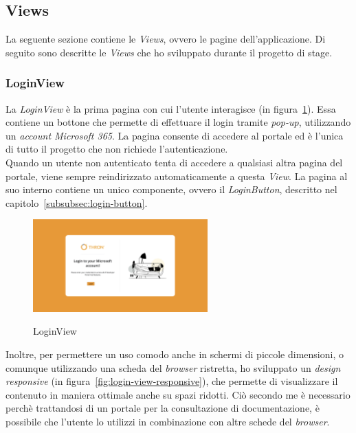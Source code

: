 \subsection{Views}\label{subsec:views}
La seguente sezione contiene le \textit{Views}, ovvero le pagine dell'applicazione.
Di seguito sono descritte le \textit{Views} che ho sviluppato durante il progetto di stage.

\subsubsection{LoginView}\label{subsubsec:login-view}
La \textit{LoginView} è la prima pagina con cui l'utente interagisce (in figura~\ref{fig:login-view}). Essa contiene un bottone che permette di effettuare il login tramite \textit{pop-up}, utilizzando un \textit{account Microsoft 365}.
La pagina consente di accedere al portale ed è l'unica di tutto il progetto che non richiede l'autenticazione.\\
Quando un utente non autenticato tenta di accedere a qualsiasi altra pagina del portale, viene sempre reindirizzato
automaticamente a questa \textit{View}. La pagina al suo interno contiene un unico componente, ovvero il \textit{LoginButton}, descritto nel capitolo~\ref{subsubsec:login-button}.
\begin{figure}[ht]
  \centering
  \includegraphics[width=0.6\textwidth, alt={Pagina di login dell'applicazione}]{images/frontend/LoginView.jpg}
  \caption{LoginView}\label{fig:login-view}
\end{figure}

Inoltre, per permettere un uso comodo anche in schermi di piccole dimensioni, o comunque utilizzando una scheda del \textit{browser} ristretta, ho sviluppato
un \textit{design responsive} (in figura~\ref{fig:login-view-responsive}), che permette di visualizzare il contenuto in maniera ottimale anche su spazi ridotti.
Ciò secondo me è necessario perchè trattandosi di un portale per la consultazione di documentazione, è possibile che l'utente 
lo utilizzi in combinazione con altre schede del \textit{browser}.

